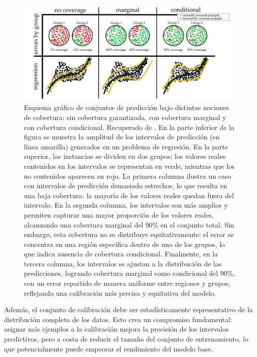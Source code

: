 \begin{figure}[h]
    \centering
    \includegraphics[width=\textwidth]{capitulos/cap_02/imagenes/coverage_types.png}
    \caption[
        Esquema gráfico de conjuntos de predicción bajo distintas nociones de cobertura: sin cobertura garantizada, con cobertura marginal y con cobertura condicional. 
    ]{
        Esquema gráfico de conjuntos de predicción bajo distintas nociones de cobertura: sin cobertura garantizada, con cobertura marginal y con cobertura condicional. Recuperado de \cite{angelopoulos2021}.
        En la parte inferior de la figura se muestra la amplitud de los intervalos de predicción (en línea amarilla) generados en un problema de regresión. En la parte superior, las instancias se dividen en dos grupos; los valores reales contenidos en los intervalos se representan en verde, mientras que los no contenidos aparecen en rojo.
        La primera columna ilustra un caso con intervalos de predicción demasiado estrechos, lo que resulta en una baja cobertura: la mayoría de los valores reales quedan fuera del intervalo.
        En la segunda columna, los intervalos son más amplios y permiten capturar una mayor proporción de los valores reales, alcanzando una cobertura marginal del 90\% en el conjunto total. Sin embargo, esta cobertura no se distribuye equitativamente: el error se concentra en una región específica dentro de uno de los grupos, lo que indica ausencia de cobertura condicional.
        Finalmente, en la tercera columna, los intervalos se ajustan a la distribución de las predicciones, logrando cobertura marginal como condicional del 90\%, con un error repartido de manera uniforme entre regiones y grupos, reflejando una calibración más precisa y equitativa del modelo.
    } 
    \label{fig:coverage}
\end{figure}


Además, el conjunto de calibración debe ser estadísticamente representativo de la distribución completa de los datos. Esto crea un compromiso fundamental: asignar más ejemplos a la calibración mejora la precisión de los intervalos predictivos, pero a costa de reducir el tamaño del conjunto de entrenamiento, lo que potencialmente puede empeorar el rendimiento del modelo base.

